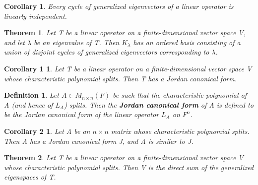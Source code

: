 \documentclass{article}
\newcommand{\bd}[1]{\textbf{#1}}
\theoremstyle{plain}
\newtheorem{theorem}{Theorem}[section]
\newtheorem*{corollary}{Corollary}
\newtheorem*{corollary1}{Corollary 1}
\newtheorem*{corollary2}{Corollary 2}
\newtheorem*{definition1}{Definition}
\theoremstyle{plain} %
\begin{document}
\begin{corollary}
  Every cycle of generalized eigenvectors of a linear operator is linearly independent.
\end{corollary}

\begin{theorem}
  Let T be a linear operator on a finite-dimensional vector space V, and let $\lambda$ be an eigenvalue of T. Then $K_\lambda$ has an ordered basis consisting of a union of disjoint cycles of generalized eigenvectors corresponding to $\lambda$.
\end{theorem}

\begin{corollary1}
  Let T be a linear operator on a finite-dimensional vector space V whose characteristic polynomial splits. Then T has a Jordan canonical form.
\end{corollary1}

\begin{definition1}
  Let $A \in M_{n\times n}(F)$ be such that the characteristic polynomial of A (and hence of $L_A$) splits. Then the \bd{Jordan canonical form} of A is defined to be the Jordan canonical form of the linear operator $L_A$ on $F^n$.
\end{definition1}

\begin{corollary2}
  Let A be an $n \times n$ matrix whose characteristic polynomial splits. Then A has a Jordan canonical form J, and A is similar to J.
\end{corollary2}

\begin{theorem}
  Let T be a linear operator on a finite-dimensional vector space V whose characteristic polynomial splits. Then V is the direct sum of the generalized eigenspaces of T.
\end{theorem}
\end{document}

